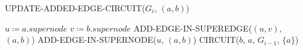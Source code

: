 \begin{algorithm}[H]
    \caption{UPDATE-ADDED-EDGE-CIRCUIT($G_i$, $(a, b)$)}\label{alg:add-edge-circuit}
    \begin{algorithmic}[1]
        \State $u \coloneqq a.supernode$
        \State $v \coloneqq b.supernode$
            \State ADD-EDGE-IN-SUPEREDGE($(u, v)$, $(a, b)$)
        \Else
            \State ADD-EDGE-IN-SUPERNODE($u$, $(a, b)$)
        \EndIf
        \State CIRCUIT($b$, $a$, $G_{i-1}$, $\{a\}$)
    \end{algorithmic}
\end{algorithm}